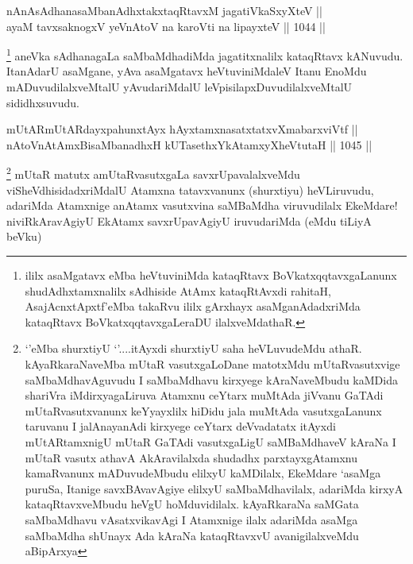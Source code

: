 \begin{shl}
nAnAsAdhanasaMbanAdhxtakxtaqRtavxM jagatiVkaSxyXteV || \\
ayaM tavxsaknogxV yeVnAtoV na karoVti na lipayxteV ||  1044 ||   
\end{shl}

\begin{artha}
\footnote{ililx asaMgatavx eMba heVtuviniMda kataqRtavx BoVkatxqqtavxgaLanunx shudAdhxtamxnalilx sAdhiside AtAmx kataqRtAvxdi rahitaH, AsajAcnxtApxtf'eMba takaRvu ililx gArxhayx asaMganAdadxriMda kataqRtavx BoVkatxqqtavxgaLeraDU ilalxveMdathaR.}
aneVka sAdhanagaLa saMbaMdhadiMda jagatitxnalilx kataqRtavx kANuvudu. ItanAdarU asaMgane, yAva 
asaMgatavx heVtuviniMdaleV Itanu EnoMdu mADuvudilalxveMtalU yAvudariMdalU leVpisilapxDuvudilalxveMtalU sididhxsuvudu. 
\end{artha}


\begin{shl}
mUtARmUtARdayxpahunxtAyx hAyxtamxnasatxtatxvXmabarxviVtf || \\
nAtoV\s nAtAmxBisaMbanadhxH kUTasethxYkAtamxyXheVtutaH ||  1045 ||  
\end{shl}

\begin{artha}
\footnote{`\stext'eMba shurxtiyU `\stext'....itAyxdi shurxtiyU saha heVLuvudeMdu athaR. kAyaRkaraNaveMba mUtaR vasutxgaLoDane matotxMdu mUtaRvasutxvige saMbaMdhavAguvudu I saMbaMdhavu kirxyege kAraNaveMbudu kaMDida shariVra iMdirxyagaLiruva Atamxnu ceYtarx muMtAda jiVvanu GaTAdi mUtaRvasutxvanunx keYyayxlilx hiDidu jala muMtAda vasutxgaLanunx taruvanu I jalAnayanAdi kirxyege ceYtarx deVvadatatx itAyxdi mUtARtamxnigU mUtaR GaTAdi vasutxgaLigU saMBaMdhaveV kAraNa I mUtaR vasutx athavA AkAravilalxda shudadhx parxtayxgAtamxnu kamaRvanunx mADuvudeMbudu elilxyU kaMDilalx, EkeMdare `asaMga puruSa, Itanige savxBAvavAgiye elilxyU saMbaMdhavilalx, adariMda kirxyA kataqRtavxveMbudu heVgU hoMduvidilalx. kAyaRkaraNa saMGata saMbaMdhavu vAsatxvikavAgi I Atamxnige ilalx adariMda asaMga saMbaMdha shUnayx Ada kAraNa kataqRtavxvU avanigilalxveMdu aBipArxya}
mUtaR matutx amUtaRvasutxgaLa savxrUpavalalxveMdu viSheVdhisidadxriMdalU Atamxna tatavxvanunx (shurxtiyu) heVLiruvudu, adariMda Atamxnige anAtamx vasutxvina saMBaMdha viruvudilalx EkeMdare! niviRkAravAgiyU EkAtamx savxrUpavAgiyU iruvudariMda (eMdu tiLiyA beVku)
\end{artha}

